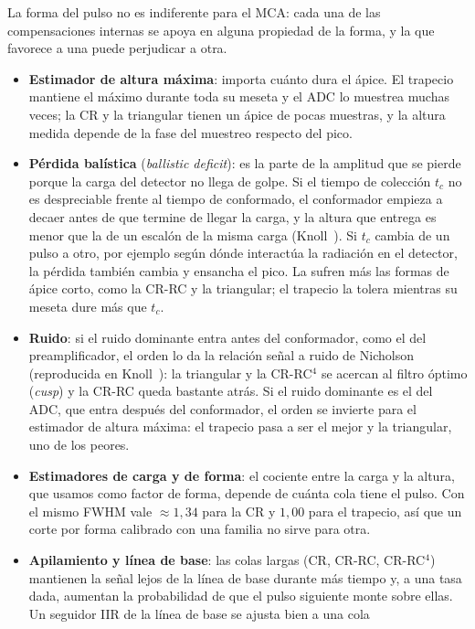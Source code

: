 La forma del pulso no es indiferente para el MCA: cada una de las compensaciones
internas se apoya en alguna propiedad de la forma, y la que favorece a una puede
perjudicar a otra.
\begin{itemize}
  \item \textbf{Estimador de altura máxima}: importa cuánto dura el ápice. El
    trapecio mantiene el máximo durante toda su meseta y el ADC lo muestrea
    muchas veces; la CR y la triangular tienen un ápice de pocas muestras, y la
    altura medida depende de la fase del muestreo respecto del pico.
  \item \textbf{Pérdida balística} (\emph{ballistic deficit}): es la parte de la
    amplitud que se pierde porque la carga del detector no llega de golpe. Si el
    tiempo de colección $t_c$ no es despreciable frente al tiempo de conformado,
    el conformador empieza a decaer antes de que termine de llegar la carga, y
    la altura que entrega es menor que la de un escalón de la misma carga
    (Knoll~). Si $t_c$ cambia de un pulso a otro, por
    ejemplo según dónde interactúa la radiación en el detector, la pérdida
    también cambia y ensancha el pico. La sufren más las formas de ápice corto,
    como la CR-RC y la triangular; el trapecio la tolera mientras su meseta dure
    más que $t_c$.
  \item \textbf{Ruido}: si el ruido dominante entra antes del conformador, como
    el del preamplificador, el orden lo da la relación señal a ruido de
    Nicholson~\cite{Nicholson1974} (reproducida en
    Knoll~): la triangular y la CR-RC$^4$ se acercan al
    filtro óptimo (\emph{cusp}) y la CR-RC queda bastante atrás. Si el ruido
    dominante es el del ADC, que entra después del conformador, el orden se
    invierte para el estimador de altura máxima: el trapecio pasa a ser el mejor
    y la triangular, uno de los peores.
  \item \textbf{Estimadores de carga y de forma}: el cociente entre la carga y
    la altura, que usamos como factor de forma, depende de cuánta cola tiene el
    pulso. Con el mismo FWHM vale $\approx 1,34$ para la CR y $1,00$ para el
    trapecio, así que un corte por forma calibrado con una familia no sirve para
    otra.
  \item \textbf{Apilamiento y línea de base}: las colas largas (CR, CR-RC,
    CR-RC$^4$) mantienen la señal lejos de la línea de base durante más tiempo
    y, a una tasa dada, aumentan la probabilidad de que el pulso siguiente monte
    sobre ellas. Un seguidor IIR de la línea de base se ajusta bien a una cola

\end{itemize}
